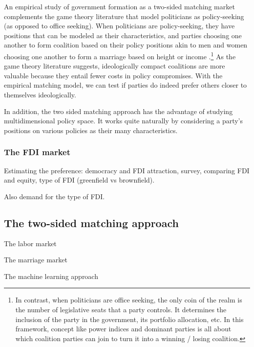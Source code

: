 An empirical study of government formation as a two-sided matching market complements the game theory literature that model politicians as policy-seeking (as
opposed to office seeking). When politicians are policy-seeking, they have
positions that can be modeled as their characteristics, and parties choosing one
another to form coalition based on their policy positions akin to men and women
choosing one another to form a marriage based on height or income \cite{Laver1998}.\footnote{In
  contrast, when politicians are office seeking, the only coin of the realm is the number of legislative seats that a
party controls. It determines the inclusion of the party in the government, its portfolio
allocation, etc. In this framework, concept like power indices and dominant
parties is all about which coalition parties can join to turn it into a winning /
losing coalition.} As the game theory literature suggests, ideologically compact
coalitions are more valuable because they entail fewer costs in policy
compromises. With the empirical matching model, we can test if parties do indeed
prefer others closer to themselves ideologically.

In addition, the two sided matching approach has the advantage of studying
multidimensional policy space. It works quite naturally by considering a party's
positions on various policies as their many characteristics.

\subsubsection{The FDI market}

Estimating the preference: democracy and FDI attraction, survey, comparing FDI
and equity, type of FDI (greenfield vs brownfield).

Also demand for the type of FDI.

\subsection{The two-sided matching approach}

The labor market

The marriage market

The machine learning approach
